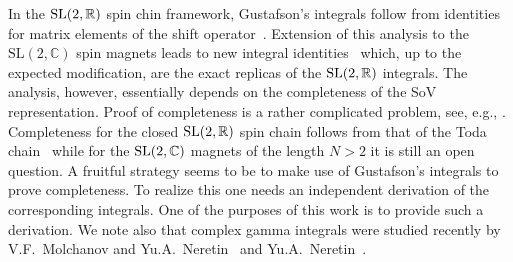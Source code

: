 In the ${\rm SL}(2,\mathbb R)$ spin chin framework, Gustafson's integrals follow from identities for matrix elements
of the shift operator~\cite{Derkachov:2016dhc}.
 Extension of this analysis to the
$\mathrm{SL}(2,\mathbb{C})$ spin magnets leads to new integral identities~\cite{Derkachov:2016ucn,Derkachov:2017pvx}
which, up to the expected modification, are the exact replicas of the ${\rm SL}(2,\mathbb R)$ integrals. The analysis,
however, essentially depends on the completeness of the SoV representation. Proof of completeness is a rather
complicated problem, see, e.g., \cite{Derkachov:2018lyz,Kozlowski:2014jka,Schrader18}. Completeness for the closed
${\rm SL}(2,\mathbb R)$ spin chain follows from that of the Toda chain~\cite{Kozlowski:2014jka} while for the
${\rm SL}(2,\mathbb C)$ magnets of the length $N>2$ it is still an open question. A fruitful strategy seems to be to
make use of Gustafson's integrals to prove completeness. To realize this one needs an independent derivation of the
corresponding integrals. One of the purposes of this work is to provide such a derivation. We note also that complex
gamma integrals were studied recently by V.F.~Molchanov and Yu.A.~Neretin~\cite{Neretin} and
Yu.A.~Neretin~\cite{2018arXiv181207341N,Neretin:2019xze}.
